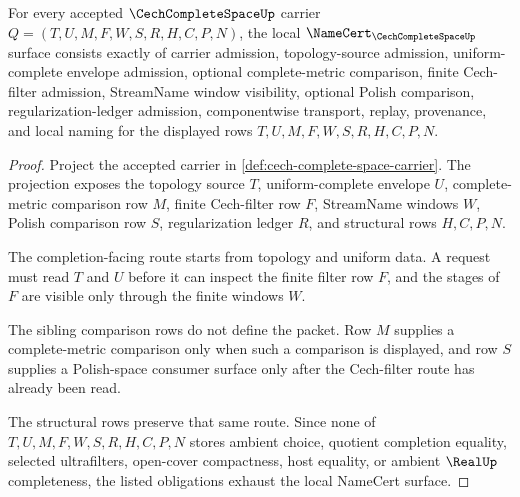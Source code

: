 \begin{theorem}\label{thm:cech-complete-space-namecert-obligations}
For every accepted $\CechCompleteSpaceUp$ carrier $Q=(T,U,M,F,W,S,R,H,C,P,N)$, the local $\NameCert_{\CechCompleteSpaceUp}$ surface consists exactly of carrier admission, topology-source admission, uniform-complete envelope admission, optional complete-metric comparison, finite Cech-filter admission, StreamName window visibility, optional Polish comparison, regularization-ledger admission, componentwise transport, replay, provenance, and local naming for the displayed rows $T,U,M,F,W,S,R,H,C,P,N$.
\end{theorem}
\begin{proof}
Project the accepted carrier in \autoref{def:cech-complete-space-carrier}. The projection exposes the topology source $T$, uniform-complete envelope $U$, complete-metric comparison row $M$, finite Cech-filter row $F$, StreamName windows $W$, Polish comparison row $S$, regularization ledger $R$, and structural rows $H,C,P,N$.

The completion-facing route starts from topology and uniform data. A request must read $T$ and $U$ before it can inspect the finite filter row $F$, and the stages of $F$ are visible only through the finite windows $W$.

The sibling comparison rows do not define the packet. Row $M$ supplies a complete-metric comparison only when such a comparison is displayed, and row $S$ supplies a Polish-space consumer surface only after the Cech-filter route has already been read.

The structural rows preserve that same route. Since none of $T,U,M,F,W,S,R,H,C,P,N$ stores ambient choice, quotient completion equality, selected ultrafilters, open-cover compactness, host equality, or ambient $\RealUp$ completeness, the listed obligations exhaust the local NameCert surface.
\end{proof}

